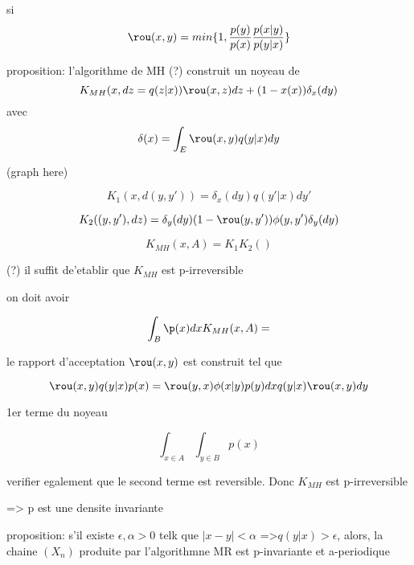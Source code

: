\documentclass{article}
\begin{document}
si 
\begin{equation}
\rou(x,y) = min\{1,\frac{p(y)}{p(x)}\frac{p(x|y)}{p(y|x)}\}
\end{equation}

proposition: 
l'algorithme de MH (?) construit un noyeau de
\begin{equation}
K_{MH}(x,dz=q(z|x))\rou(x,z)dz+(1-x(x))\delta_x(dy)
\end{equation}
avec
\begin{equation}
\delta(x)=\int_E \rou(x,y)q(y|x)dy
\end{equation}


(graph here)


\begin{equation}
K_1(x, d(y,y')) = \delta_x(dy)q(y'|x)dy'
\end{equation}

\begin{equation}
K_2((y,y'),dz) =\delta_y(dy)(1-\rou(y,y'))\phi(y,y')\delta_y(dy)
\end{equation}


\begin{equation}
K_{MH}(x,A)=K_1K_2()
\end{equation}

(?)
il suffit de'etablir que $K_{MH}$ est p-irreversible

on doit avoir

\begin{equation}
\int_B \p(x)dxK_{MH}(x,A) = 
\end{equation}

le rapport d'acceptation $\rou(x,y)$ est construit tel que 

\begin{equation}
\rou(x,y)q(y|x)p(x) = \rou(y,x)\phi(x|y)p(y)dxq(y|x)\rou(x,y)dy
\end{equation}

1er terme du noyeau

\begin{equation}
\int_{x\in A} \int_{y\in B} p(x)
\end{equation}

verifier egalement que le second terme est reversible. Donc $K_{MH}$ est p-irreversible 

=> p est une densite invariante

proposition:  s'il existe $\epsilon,\alpha > 0$ telk que $|x-y|<\alpha$
=>$q(y|x)>\epsilon$, alors, la chaine $(X_n)$ produite par l'algorithmne MR est p-invariante et a-periodique
\end{document}
